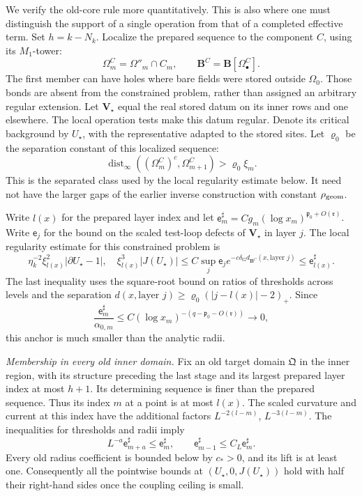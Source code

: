 \documentclass[11pt,letterpaper,reqno]{amsart}
\theoremstyle{definition}
\theoremstyle{remark}
\begin{document}
We verify the old-core rule more quantitatively. This is also
where one must distinguish the support of a single operation
from that of a completed effective term.
Set \(h=k-N_k\). Localize the prepared sequence to the
component \(C\), using its \(M_1\)-tower:
\[
 \Omega^C_m=\Omega''_m\cap C_m,\qquad
 \mathbf B^C=\mathbf B[\Omega^C_\bullet].
\]
The first member can have holes where bare fields were
stored outside \(\Omega_0\). Those bonds are absent from
the constrained problem, rather than assigned an arbitrary
regular extension. Let \(\mathbf V_\star\) equal the real
stored datum on its inner rows and one elsewhere.
The local operation tests make this datum regular.
Denote its critical background by \(U_\star\), with the
representative adapted to the stored sites.
Let \(\varrho_0\) be the separation constant of this
localized sequence:
\[
 \operatorname{dist}_\infty((\Omega^C_m)^c,\Omega^C_{m+1})
                         >\varrho_0\xi_m.
\]
This is the separated class used by the local regularity
estimate below. It need not have the larger gaps of the
earlier inverse construction with constant \(\rho_{\rm geom}\).

Write \(l(x)\) for the prepared layer index and let
\(\mathsf e^\sharp_m=Cg_m(\log x_m)^{\mathfrak p_0+O(\mathfrak r)}\).
Write \(\mathsf e_j\) for the bound on the scaled
test-loop defects of \(\mathbf V_\star\) in layer \(j\).
The local regularity estimate for this constrained problem
is
\begin{equation}\label{eq:anchor-layer-profile}
 \eta_k^{-2}\xi_{l(x)}^2|\partial U_\star-1|,
 \quad \xi_{l(x)}^3|J(U_\star)|
 \le C\sup_j \mathsf e_j
           e^{-c\delta_{\mathrm G}d_{\mathbf B^C}(x,\text{layer }j)}
 \le\mathsf e^\sharp_{l(x)}.
\end{equation}
The last inequality uses the square-root bound on ratios
of thresholds across levels and the separation
\(d(x,\text{layer }j)\ge
\varrho_0(|j-l(x)|-2)_+\).
Since
\[
 \frac{\mathsf e^\sharp_m}{\alpha_{0,m}}
       \le C(\log x_m)^{-(q-\mathfrak p_0-O(\mathfrak r))}
                         \longrightarrow0,
\]
this anchor is much smaller than the analytic radii.

\emph{Membership in every old inner domain.}
Fix an old target domain \(\mathfrak Q\) in the inner
region, with its structure preceding the last stage and
its largest prepared layer index at most \(h+1\).
Its determining sequence is finer than the prepared
sequence. Thus its index \(m\) at a point is at most
\(l(x)\). The scaled curvature and current at this
index have the additional factors
\(L^{-2(l-m)}\), \(L^{-3(l-m)}\).
The inequalities for thresholds and radii imply
\[
 L^{-a}\mathsf e^\sharp_{m+a}\le\mathsf e^\sharp_m,
 \qquad
 \mathsf e^\sharp_{m-1}\le C_L\mathsf e^\sharp_m.
\]
Every old radius coefficient is bounded below by
\(c_*>0\), and its lift is at least one.
Consequently all the pointwise bounds at
\((U_\star,0,J(U_\star))\) hold with half their
right-hand sides once the coupling ceiling is small.
\end{document}
